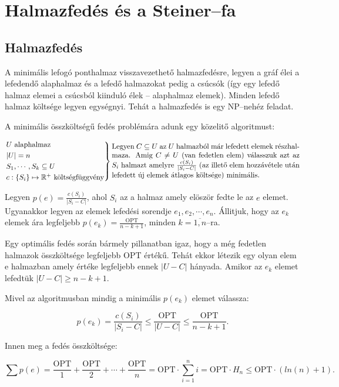 \newpage
\section{Halmazfedés és a Steiner--fa}

\subsection{Halmazfedés}
A minimális lefogó ponthalmaz visszavezethető halmazfedésre, legyen a gráf élei
a lefedendő alaphalmaz és a lefedő halmazokat pedig a csúcsók (így egy lefedő
halmaz elemei a csúcsból kiinduló élek -- alaphalmaz elemek). Minden lefedő
halmaz költsége legyen egységnyi. Tehát a halmazfedés is egy NP--nehéz feladat.

A minimális összköltségű fedés problémára adunk egy közelitő algoritmust:

\[
\begin{rcases}
U \mbox{ alaphalmaz} \\
|U| = n \\
S_1, \cdots, S_k \subseteq U \\
c : \{ S_i\} \mapsto \mathbb{R}^+ \mbox{ költségfüggvény} \end{rcases}
\parbox[L]{9cm} { Legyen $C\subseteq U$ az $U$ halmazból már lefedett elemek
részhalmaza. Amig $C \neq U$ (van fedetlen elem) válasszuk azt az $S_i$ halmazt
amelyre $\frac{c(S_i)}{|S_i-C|}$ (az illető elem hozzávétele után lefedett új
elemek átlagos költsége) minimális.
}
\]

Legyen $p(e)=\frac{c(S_i)}{|S_i-C|}$, ahol $S_i$ az a halmaz amely elöször fedte
le az $e$ elemet. Ugyanakkor legyen az elemek lefedési sorendje $e_1, e_2,
\cdots, e_n$. Állitjuk, hogy az $e_k$ elemek ára legfeljebb
$p(e_k)=\frac{\mbox{OPT}}{n-k+1}$, minden $k=\overline{1,n}$--ra.

Egy
optimális fedés során bármely pillanatban igaz, hogy a még fedetlen halmazok
összköltsége legfeljebb OPT értékű. Tehát ekkor létezik egy olyan elem e
halmazban amely értéke legfeljebb ennek $|U-C|$ hányada. Amikor az $e_k$ elemet
lefedtük $|U-C| \geq n-k+1$.

Mivel az algoritmusban mindig a minimális $p(e_k)$ elemet válassza:

\[p(e_k)=\frac{c(S_i)}{|S_i-C|} \leq \frac{\mbox{OPT}}{|U-C|} \leq  \frac{\mbox{OPT}}{n-k+1}.\]

Innen meg a fedés összköltsége:

\[\sum p(e) = \frac{\mbox{OPT}}{1} + \frac{\mbox{OPT}}{2} + \cdots + \frac{\mbox{OPT}}{n}= 
\mbox{OPT} \cdot \sum_{i=1}^n i = \mbox{OPT} \cdot H_n  \leq \mbox{OPT}  \cdot (ln(n)+1). \]

